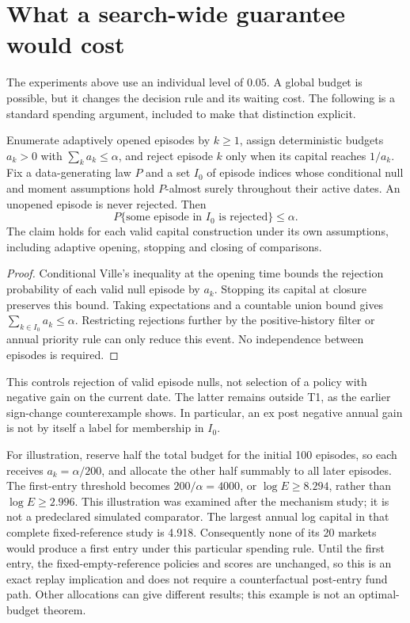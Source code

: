 \section{What a search-wide guarantee would cost}
\label{sec:global-budget}
The experiments above use an individual level of $0.05$. A global budget is
possible, but it changes the decision rule and its waiting cost. The following
is a standard spending argument, included to make that distinction explicit.

\begin{proposition}
Enumerate adaptively opened episodes by $k\ge1$, assign deterministic budgets
$a_k>0$ with $\sum_k a_k\le\alpha$, and reject episode $k$ only when its
capital reaches $1/a_k$. Fix a data-generating law $P$ and a set $I_0$ of episode
indices whose conditional null and moment assumptions hold $P$-almost surely
throughout their active dates. An unopened episode is never rejected. Then
\[
 P\{\text{some episode in }I_0\text{ is rejected}\}\le\alpha.
\]
The claim holds for each valid capital construction under its own assumptions,
including adaptive opening, stopping and closing of comparisons.
\end{proposition}
\begin{proof}
Conditional Ville's inequality at the opening time bounds the rejection
probability of each valid null episode by $a_k$. Stopping its capital at
closure preserves this bound. Taking expectations and a countable union bound
gives $\sum_{k\in I_0}a_k\le\alpha$. Restricting rejections further by the
positive-history filter or annual priority rule can only reduce this event.
No independence between episodes is required.
\end{proof}

This controls rejection of valid episode nulls, not selection of a policy with
negative gain on the current date. The latter remains outside T1, as the
earlier sign-change counterexample shows. In particular, an ex post negative
annual gain is not by itself a label for membership in $I_0$.

For illustration, reserve half the total budget for the initial 100 episodes,
so each receives $a_k=\alpha/200$, and allocate the other half summably to all
later episodes. The first-entry threshold becomes $200/\alpha=4000$, or
$\log E\ge8.294$, rather than $\log E\ge2.996$. This illustration was examined
after the mechanism study; it is not a predeclared simulated comparator.
The largest annual log capital in that complete fixed-reference study is
4.918. Consequently none of its 20 markets would produce a first entry under
this particular spending rule. Until the first entry, the fixed-empty-reference
policies and scores are unchanged, so this is an exact replay implication and
does not require a counterfactual post-entry fund path. Other allocations can
give different results; this example is not an optimal-budget theorem.


